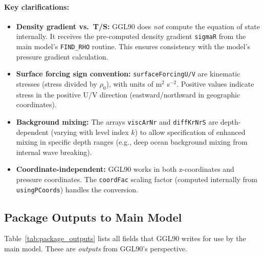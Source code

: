\documentclass[12pt,letterpaper]{article}
\begin{document}
\paragraph{Key clarifications:}
\begin{itemize}
\item \textbf{Density gradient vs.\ T/S:} GGL90 does \emph{not} compute the equation of state internally. It receives the pre-computed density gradient \verb|sigmaR| from the main model's \verb|FIND_RHO| routine. This ensures consistency with the model's pressure gradient calculation.

\item \textbf{Surface forcing sign convention:} \verb|surfaceForcingU/V| are kinematic stresses (stress divided by $\rho_0$), with units of m$^2$ s$^{-2}$. Positive values indicate stress in the positive U/V direction (eastward/northward in geographic coordinates).

\item \textbf{Background mixing:} The arrays \verb|viscArNr| and \verb|diffKrNrS| are depth-dependent (varying with level index $k$) to allow specification of enhanced mixing in specific depth ranges (e.g., deep ocean background mixing from internal wave breaking).

\item \textbf{Coordinate-independent:} GGL90 works in both z-coordinates and pressure coordinates. The \verb|coordFac| scaling factor (computed internally from \verb|usingPCoords|) handles the conversion.
\end{itemize}

\subsection{Package Outputs to Main Model}
\label{app:package_outputs}

Table~\ref{tab:package_outputs} lists all fields that GGL90 writes for use by the main model. These are \emph{outputs} from GGL90's perspective.
\end{document}
